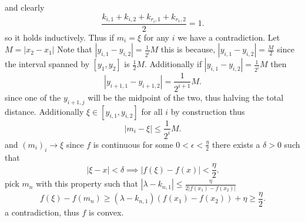 \documentclass[11pt]{article}
\begin{document}
{and clearly
\[
    \frac{k_{i,1} + k_{i,2} + k_{r_i,1} + k_{r_1,2}}{2} = 1
.\] 
so it holds inductively. Thus if $m_i = \xi$ for any $i$ we have a contradiction.
Let $M = |x_2-x_1|$
Note that $|y_{i,1} - y_{i,2}| = \frac{1}{2^{i}}M$ this is because, $|y_{i,1}-y_{i,2}| = \frac{M}{2}$ since the interval spanned by $[y_1,y_2]$ is $\frac{1}{2}M$.
Additionally if $|y_{i,1}-y_{i,2}| = \frac{1}{2^{i}}M$ then
\[
    |y_{i+1,1}-y_{i+1,2}| = \frac{1}{2^{i+1}}M
.\] 
since one of the $y_{i+1,j}$ will be the midpoint of the two, thus halving the total distance. Additionally  $\xi \in [y_{i,1},y_{i,2}]$ for all  $i$ by construction
thus
 \[
|m_i - \xi| \le \frac{1}{2^{i}}M
.\] 
and $(m_i)_i \rightarrow \xi$ since $f$ is continuous for some  $0 <\epsilon < \frac{\eta}{2}$ there exists a $\delta > 0$ such that
\[
|\xi - x| < \delta \implies |f(\xi) - f(x)| < \frac{\eta}{2}
.\] 
pick $m_n$ with this property such that $|\lambda - k_{n,1}| \le \frac{\eta}{2|f(x_1) - f(x_2)|}$
\[
    f(\xi) - f(m_n) \ge (\lambda - k_{n,1})(f(x_1)-f(x_2)) + \eta \ge \frac{\eta}{2}
.\] 
a contradiction, thus $f$ is convex.
}
\end{document}
